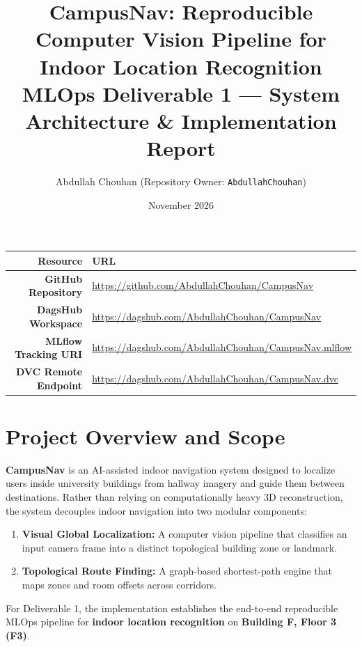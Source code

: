 \documentclass[10pt,a4paper]{article}
\title{\textbf{CampusNav: Reproducible Computer Vision Pipeline for Indoor Location Recognition}\\[0.4em]
\large MLOps Deliverable 1 — System Architecture \& Implementation Report}
\author{Abdullah Chouhan \quad (Repository Owner: \texttt{AbdullahChouhan})}
\date{November 2026}
\begin{document}
\maketitle

\vspace{-1em}
\begin{center}
\begin{tabular}{rl}
\toprule
\textbf{Resource} & \textbf{URL} \\
\midrule
\textbf{GitHub Repository} & \url{https://github.com/AbdullahChouhan/CampusNav} \\
\textbf{DagsHub Workspace} & \url{https://dagshub.com/AbdullahChouhan/CampusNav} \\
\textbf{MLflow Tracking URI} & \url{https://dagshub.com/AbdullahChouhan/CampusNav.mlflow} \\
\textbf{DVC Remote Endpoint} & \url{https://dagshub.com/AbdullahChouhan/CampusNav.dvc} \\
\bottomrule
\end{tabular}
\end{center}

\section{Project Overview and Scope}
\textbf{CampusNav} is an AI-assisted indoor navigation system designed to localize users inside university buildings from hallway imagery and guide them between destinations. Rather than relying on computationally heavy 3D reconstruction, the system decouples indoor navigation into two modular components:
\begin{enumerate}
    \item \textbf{Visual Global Localization:} A computer vision pipeline that classifies an input camera frame into a distinct topological building zone or landmark.
    \item \textbf{Topological Route Finding:} A graph-based shortest-path engine that maps zones and room offsets across corridors.
\end{enumerate}

For Deliverable 1, the implementation establishes the end-to-end reproducible MLOps pipeline for \textbf{indoor location recognition} on \textbf{Building F, Floor 3 (F3)}.
\end{document}
